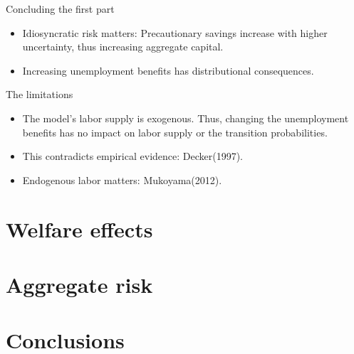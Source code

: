 \documentclass{beamer}
\begin{document}
\begin{frame}{Concluding the first part}
	
	\begin{itemize}
	
	\item {
Idiosyncratic risk matters: 
Precautionary savings increase with higher uncertainty, thus increasing aggregate capital. 
	}	
	\item {
Increasing unemployment benefits has distributional consequences. 
	}	

	\end{itemize} 
\end{frame}

\begin{frame}{The limitations}
	
	\begin{itemize}
	
	\item {The model's labor supply is exogenous. Thus, changing the unemployment benefits has no impact on labor supply or the transition probabilities.
}	
	\item {This contradicts empirical evidence: Decker(1997).
	}
	\item{Endogenous labor matters: Mukoyama(2012).
	}

	\end{itemize} 
\end{frame}


\section{Welfare effects}
\subsection{}


\section{Aggregate risk}
\subsection{}

\section{Conclusions}
\subsection{}
\end{document}
